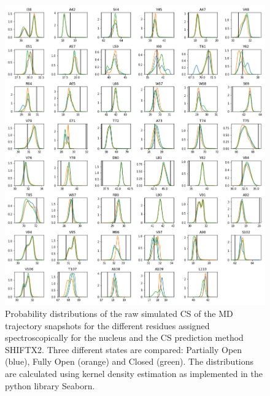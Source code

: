 \documentclass[%
 aip,
 amsmath,amssymb,
 preprint,%
]{revtex4-1}
\newcommand{\cb}{\ce{C_\beta} }
\begin{document}
\begin{figure}[tbp]
	\includegraphics[width=\textwidth]{figures_SI/hist_sparta_plus_CB.png}
	 \caption{\scriptsize
 Probability distributions of the raw simulated CS of the MD trajectory snapshots for the different residues assigned spectroscopically for the \cb nucleus and the CS prediction method SHIFTX2. Three different states are compared: Partially Open (blue), Fully Open (orange) and Closed (green). The distributions are calculated using kernel density estimation as implemented in the python library Seaborn. 
}
\label{SI_hist6}
\end{figure}
\end{document}
